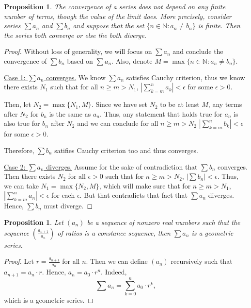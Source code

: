 \documentclass{article}
\newtheorem{proposition}[thm]{Proposition}
\begin{document}
\begin{proposition}
    The convergence of a series does not depend on any finite number of terms, though the 
    value of the limit does. More precisely, consider series $\sum a_n$ and $\sum b_n$ and suppose 
    that the set $\{n\in\mathbb{N}:a_n\neq b_n\}$ is finite. Then the series both converge or else 
    the both diverge.
\end{proposition}
\begin{proof}
    Without loss of generality, we will focus on $\sum a_n$ and conclude the convergence of 
    $\sum b_n$ based on $\sum a_n$. Also, denote $M=\max\{n\in\mathbb{N}:a_n\neq b_n\}$.

    \underline{Case 1: $\sum a_n$ converges.} We know $\sum a_n$ satisfies Cauchy criterion, 
    thus we know there exists $N_1$ such that for all $n\ge m>N_1$, 
    $\left|\sum_{k=m}^{n}a_k\right|<\epsilon$ for some $\epsilon>0$. 
    
    Then, let 
    $N_2=\max\{N_1, M\}$. Since we have set $N_2$ to be at least $M$, any terms after $N_2$ for 
    $b_n$ is the same as $a_n$. Thus, any statement that holds true for $a_n$ is also true for $b_n$
    after $N_2$ and we can conclude for all $n\ge m>N_2$ $\left|\sum_{k=m}^{n}b_k\right|<\epsilon$ 
    for some $\epsilon>0$.

    Therefore, $\sum b_n$ satifies Cauchy criterion too and thus converges.

    \underline{Case 2: $\sum a_n$ diverges.} Assume for the sake of contradiction that $\sum b_n$ 
    converges. Then there exists $N_2$ for all $\epsilon>0$ such that for $n\ge m>N_2$, 
    $\left|\sum b_n\right|<\epsilon$. Thus, we can take $N_1=\max\{N_2,M\}$, which will make sure 
    that for $n\ge m>N_1$, $\left|\sum_{k=m}^n a_n\right|<\epsilon$ for each $\epsilon$. 
    But that contradicts that fact that $\sum a_n$ diverges. Hence, $\sum b_n$ must diverge.
\end{proof}

\begin{proposition}
    Let $(a_n)$ be a sequence of nonzero real numbers such that the sequence 
    $\left(\frac{a_{n+1}}{a_n}\right)$ of ratios is a constance sequence, then $\sum a_n$ is a 
    geometric series.
\end{proposition}
\begin{proof}
    Let $r = \frac{a_{n+1}}{a_n}$ for all $n$. Then we can define $(a_n)$ recursively such that 
    $a_{n+1} = a_n\cdot r$. Hence, $a_n=a_0\cdot r^n$. Indeed, 
    $$\sum a_n = \sum_{k=0}^{n}a_0\cdot r^k,$$ which is a geometric series.
\end{proof}
\end{document}
